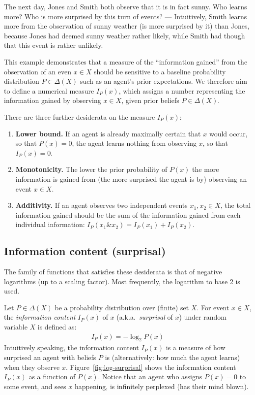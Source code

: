 \documentclass[nobib,nofonts]{tufte-handout}
\begin{document}
The next day, Jones and Smith both observe that it is in fact sunny.
Who learns more? Who is more surprised by this turn of events? ---
Intuitively, Smith learns more from the observation of sunny weather (is more surprised by it) than Jones, because Jones had deemed sunny weather rather likely, while Smith had though that this event is rather unlikely.

This example demonstrates that a measure of the ``information gained'' from the observation of an even $x \in X$ should be sensitive to a baseline probability distribution $P \in \Delta(X)$ such as an agent's prior expectations.
We therefore aim to define a numerical measure $I_{P}(x)$, which assigns a number representing the information gained by observing $x \in X$, given prior beliefs $P \in \Delta(X)$.

There are three further desiderata on the measure $I_{P}(x)$:
\begin{enumerate}
  \item \textbf{Lower bound.} If an agent is already maximally certain that $x$ would occur, so that $P(x) = 0$, the agent learns nothing from observing $x$, so that $I_{P}(x)=0$.
  \item \textbf{Monotonicity.} The lower the prior probability of $P(x)$ the more information is gained from (the more surprised the agent is by) observing an event $x \in X$.
  \item \textbf{Additivity.} If an agent observes two independent events $x_{1}, x_{2} \in X$, the total information gained should be the sum of the information gained from each individual information: $I_{P}(x_{1} \& x_{2}) = I_{P}(x_{1}) + I_{P}(x_{2})$.
\end{enumerate}

\subsection{Information content (surprisal)}

The family of functions that satisfies these desiderata is that of negative logarithms (up to a scaling factor).
Most frequently, the logarithm to base 2 is used.

Let $P\in \Delta(X)$ be a probability distribution over (finite) set $X$.
For event $x \in X$, the \emph{information content} $I_{P}(x)$ of $x$ (a.k.a.~\emph{surprisal} of $x$) under random variable $X$ is defined as:
\begin{align*}
  I_{P}(x) = - \log_{2} P(x)
\end{align*}
Intuitively speaking, the information content $I_{P}(x)$ is a measure of how surprised an agent with beliefs $P$ is (alternatively: how much the agent learns) when they observe $x$.
Figure~\ref{fig:log-surprisal} shows the information content $I_{P}(x)$ as a function of $P(x)$.
Notice that an agent who assigns $P(x) = 0$ to some event, and sees $x$ happening, is infinitely perplexed (has their mind blown).
\end{document}
